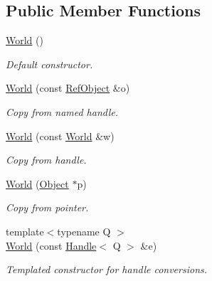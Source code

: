 \subsection*{Public Member Functions}
\begin{DoxyCompactItemize}
\item 
\hyperlink{class_d_d4hep_1_1_geometry_1_1_world_a0de7a5ff6ecdfc4ac5fc3b05585eef32}{World} ()
\begin{DoxyCompactList}\small\item\em Default constructor. \item\end{DoxyCompactList}\item 
\hyperlink{class_d_d4hep_1_1_geometry_1_1_world_ab51a5950dc7bf892672b90fb6e7c3c1f}{World} (const \hyperlink{class_d_d4hep_1_1_handle}{RefObject} \&o)
\begin{DoxyCompactList}\small\item\em Copy from named handle. \item\end{DoxyCompactList}\item 
\hyperlink{class_d_d4hep_1_1_geometry_1_1_world_a53f6b4c7c3c0187d5750c275d91b6928}{World} (const \hyperlink{class_d_d4hep_1_1_geometry_1_1_world}{World} \&w)
\begin{DoxyCompactList}\small\item\em Copy from handle. \item\end{DoxyCompactList}\item 
\hyperlink{class_d_d4hep_1_1_geometry_1_1_world_aaa4f4f1b207ec4a4245047cb48e24681}{World} (\hyperlink{class_d_d4hep_1_1_geometry_1_1_world_object}{Object} $\ast$p)
\begin{DoxyCompactList}\small\item\em Copy from pointer. \item\end{DoxyCompactList}\item 
{\footnotesize template$<$typename Q $>$ }\\\hyperlink{class_d_d4hep_1_1_geometry_1_1_world_a8c010c8fcf76bd82a943873f8b4655bb}{World} (const \hyperlink{class_d_d4hep_1_1_handle}{Handle}$<$ Q $>$ \&e)
\begin{DoxyCompactList}\small\item\em Templated constructor for handle conversions. \item\end{DoxyCompactList}\item 

\end{DoxyCompactItemize}
